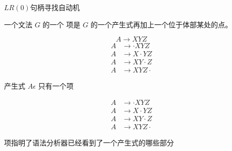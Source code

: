 \begin{frame}{}
  \begin{center}
    $LR(0)$句柄寻找自动机
  \end{center}
\end{frame}

\begin{frame}{}
  \begin{definition}[$LR(0)$项 (Item)]
    一个文法 $G$ 的一个  项是 $G$ 的一个产生式再加上一个位于体部某处的点。
  \end{definition}

  \[
    A \to XYZ
  \]
  \begin{align*}
    A &\to \cdot XYZ \\[6pt]
    A &\to X \cdot YZ \\[6pt]
    A &\to XY \cdot Z \\[6pt]
    A &\to XYZ \cdot
  \end{align*}

  \begin{center}
    产生式 $A \epsilon$ 只有一个项 
  \end{center}
\end{frame}

\begin{frame}{}
  \begin{align*}
    A &\to \cdot XYZ \\[6pt]
    A &\to X \cdot YZ \\[6pt]
    A &\to XY \cdot Z \\[6pt]
    A &\to XYZ \cdot
  \end{align*}

  \vspace{0.30cm}
  \begin{center}
    项指明了语法分析器已经看到了一个产生式的哪些部分
  \end{center}
\end{frame}

\begin{frame}{}
  \begin{definition}[项集]
  \end{definition}

  \pause
  \begin{definition}[项集族]
  \end{definition}
\end{frame}

